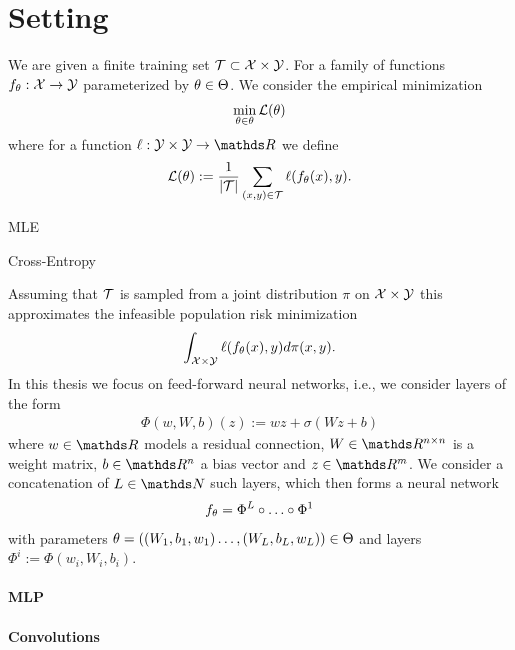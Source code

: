 \section{Setting}\label{sec:SLSet}
%
We are given a finite training set $\mathcal{T}\subset\mathcal{X}\times\mathcal{Y}$. For a family of functions $f_\theta:\mathcal{X}\to\mathcal{Y}$ parameterized by $\theta\in \Theta$. We consider the empirical  minimization
%
\begin{align*}
\min_{\theta\in\theta} \mathcal{L}(\theta) 
\end{align*} 
%
where for a function $\ell:\OutSpace\times\OutSpace\to\R$ we define
\begin{align}\label{eq:empLoss}
\mathcal{L}(\theta)  := \frac{1}{\left|\mathcal{T}\right|}\sum_{(x,y)\in \mathcal{T}} \ell(f_\theta(x), y).
\end{align}
%
%
\begin{example}{MLE}{}
	
\end{example}
%
\begin{example}{Cross-Entropy}{}
	
\end{example}
%
%
%
Assuming that $\mathcal{T}$ is sampled from a joint distribution $\pi$ on $\mathcal{X}\times\mathcal{Y}$ this approximates the infeasible population risk minimization
%
\begin{align*}
\int_{\mathcal{X}\times\mathcal{Y}} \ell(f_\theta(x), y) d\pi(x,y).
\end{align*}
%
In this thesis we focus on feed-forward neural networks, i.e., we consider layers of the form
%
\begin{align*}
\Phi(w, W, b)(z):= wz + \sigma(Wz + b)
\end{align*}
%
where $w\in\R$ models a residual connection, $W\in\R^{n\times n}$ is a weight matrix, $b\in\R^n$ a bias vector and $z\in\R^{m}$. We consider a concatenation of $L\in\N$ such layers, which then forms a neural network
%
\begin{align*}
f_\theta = \Phi^L\circ\ldots\circ\Phi^1
\end{align*} 
%
with parameters $\theta =((W_1,b_1,w_1)\ldots,(W_L,b_L,w_L))\in\Theta$ and layers $\Phi^i := \Phi(w_i, W_i, b_i)$.
%
\paragraph{MLP}

\paragraph{Convolutions}\label{sec:convlayer}


